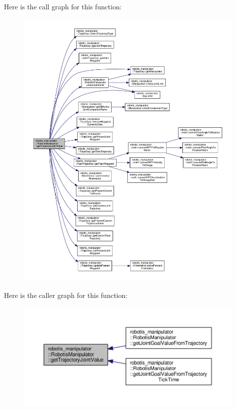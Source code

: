 Here is the call graph for this function\+:\nopagebreak
\begin{figure}[H]
\begin{center}
\leavevmode
\includegraphics[width=350pt]{classrobotis__manipulator_1_1_robotis_manipulator_a94f13f3855b973d213a260e097b25fa2_cgraph}
\end{center}
\end{figure}




Here is the caller graph for this function\+:\nopagebreak
\begin{figure}[H]
\begin{center}
\leavevmode
\includegraphics[width=350pt]{classrobotis__manipulator_1_1_robotis_manipulator_a94f13f3855b973d213a260e097b25fa2_icgraph}
\end{center}
\end{figure}


